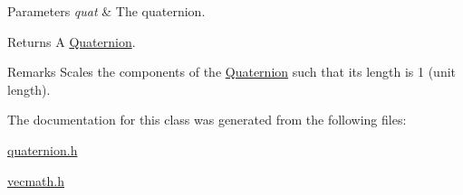 \begin{DoxyParams}{Parameters}
{\em quat} & The quaternion.\\
\hline
\end{DoxyParams}
\begin{DoxyReturn}{Returns}
A \hyperlink{classgofxmath_1_1_quaternion}{Quaternion}.
\end{DoxyReturn}
\begin{DoxyRemark}{Remarks}
Scales the components of the \hyperlink{classgofxmath_1_1_quaternion}{Quaternion} such that its length is 1 (unit length). 
\end{DoxyRemark}


The documentation for this class was generated from the following files\+:\begin{DoxyCompactItemize}
\item 
\hyperlink{quaternion_8h}{quaternion.\+h}\item 
\hyperlink{vecmath_8h}{vecmath.\+h}\end{DoxyCompactItemize}
